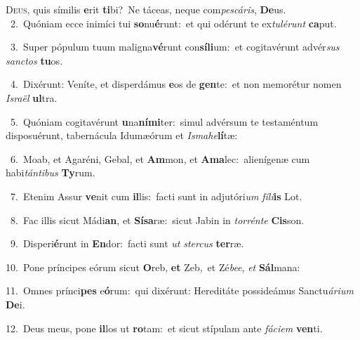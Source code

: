 \lettrine{\initial\textcolor{\initialcolor}{D}}{eus,} quis símilis \textbf{e}\-rit \textbf{ti}\-bi?~\star Ne táceas, neque com\-\textit{pes}\-\textit{cá}\textit{ris}, \textbf{De}\-us.\\
{\numbfont\textcolor{\numbcolor}{~2.}}~Quóniam ecce inimíci tui \textbf{so}\-nu\-\textbf{é}\-runt:~\star et qui odérunt te ex\-\textit{tu}\-\textit{lé}\textit{runt} \textbf{ca}\-put.\par
{\numbfont\textcolor{\numbcolor}{~3.}}~Super pópulum tuum maligna\-\textbf{vé}\-runt con\-\textbf{sí}\-\textbf{li}um:~\star et cogitavérunt advér\textit{sus} \textit{sanc}\-\textit{tos} \textbf{tu}\-os.\par
{\numbfont\textcolor{\numbcolor}{~4.}}~Dixérunt: Veníte, et disperdámus \textbf{e}\-os de \textbf{gen}\-te:~\star et non memorétur nomen \textit{Is}\-\textit{ra}\textit{ël} \textbf{ul}\-tra.\par
{\numbfont\textcolor{\numbcolor}{~5.}}~Quóniam cogitavérunt \textbf{u}\-na\-\textbf{ní}\-\textbf{mi}ter:~\star simul advérsum te testaméntum disposuérunt, tabernácula Idumæórum et \textit{Is}\-\textit{ma}\textit{he}\textbf{lí}tæ:\par
{\numbfont\textcolor{\numbcolor}{~6.}}~Moab, et Agaréni, Gebal, et \textbf{Am}\-mon, et \textbf{A}\-\textbf{ma}lec:~\star alienígenæ cum habi\-\textit{tán}\-\textit{ti}\textit{bus} \textbf{Ty}\-rum.\par
{\numbfont\textcolor{\numbcolor}{~7.}}~Etenim Assur \textbf{ve}\-nit cum \textbf{il}\-lis:~\star facti sunt in adjutóri\textit{um} \textit{fí}\-\textit{li}\textbf{is} Lot.\par
{\numbfont\textcolor{\numbcolor}{~8.}}~Fac illis sicut Mádi\-\textbf{an}\-, et \textbf{Sí}\-\textbf{sa}ræ:~\star sicut Jabin in \textit{tor}\-\textit{rén}\textit{te} \textbf{Cis}\-son.\par
{\numbfont\textcolor{\numbcolor}{~9.}}~Disperi\-\textbf{é}\-runt in \textbf{En}\-dor:~\star facti sunt \textit{ut} \textit{ster}\-\textit{cus} \textbf{ter}\-ræ.\par
{\numbfont\textcolor{\numbcolor}{10.}}~Pone príncipes eórum sicut \textbf{O}\-reb, \textbf{et} Zeb,~\star et Zé\-\textit{be}\-\textit{e}, \textit{et} \textbf{Sál}\-mana:\par
{\numbfont\textcolor{\numbcolor}{11.}}~Omnes prínci\textbf{pes} e\-\textbf{ó}\-rum:~\star qui dixérunt: Hereditáte possideámus Sanctu\-\textit{á}\-\textit{ri}\textit{um} \textbf{De}\-i.\par
{\numbfont\textcolor{\numbcolor}{12.}}~Deus meus, pone \textbf{il}\-los ut \textbf{ro}\-tam:~\star et sicut stípulam ante \textit{fá}\-\textit{ci}\textit{em} \textbf{ven}\-ti.\par
